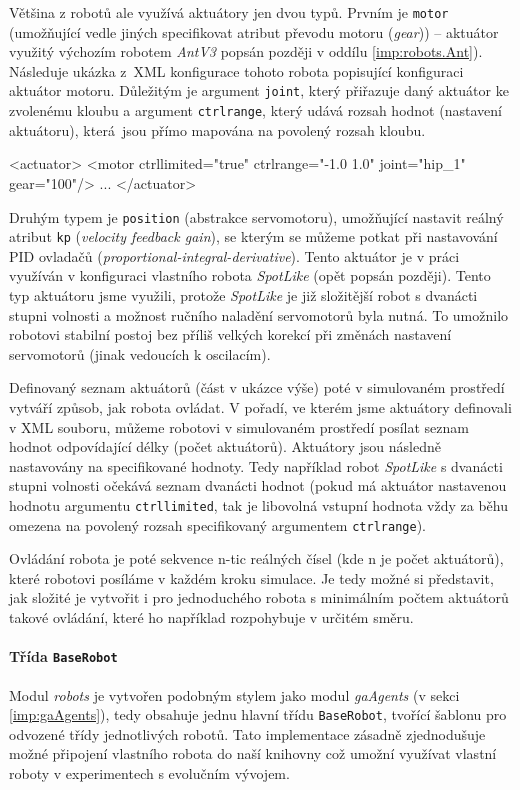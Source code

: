 Většina z robotů ale využívá aktuátory jen dvou typů. Prvním je \texttt{motor}
(umožňující vedle jiných specifikovat atribut převodu motoru (\emph{gear})) --
aktuátor využitý výchozím robotem \emph{AntV3} popsán později v oddílu
\ref{imp:robots.Ant}). Následuje ukázka z~XML konfigurace tohoto robota
popisující konfiguraci aktuátor motoru. Důležitým je argument
\texttt{joint}, který přiřazuje daný aktuátor ke zvolenému kloubu a argument
\texttt{ctrlrange}, který udává rozsah hodnot (nastavení aktuátoru), která~jsou
přímo mapována na povolený rozsah kloubu.
\begin{code}
<actuator>
  <motor ctrllimited="true" ctrlrange="-1.0 1.0" joint="hip_1"   
   gear="100"/>
  ...
</actuator>
\end{code}
Druhým typem je \texttt{position} (abstrakce servomotoru), umožňující nastavit
reálný atribut \texttt{kp} (\emph{velocity feedback gain}), se kterým se můžeme
potkat při nastavování PID ovladačů (\emph{proportional-integral-derivative}).
Tento aktuátor je v práci využíván v konfiguraci vlastního robota
\emph{SpotLike} (opět popsán později). Tento typ aktuátoru jsme využili,
protože \emph{SpotLike} je již složitější robot s dvanácti stupni volnosti a
možnost ručního naladění servomotorů byla nutná. To umožnilo robotovi stabilní
postoj bez příliš velkých korekcí při změnách nastavení servomotorů (jinak
vedoucích k oscilacím).

Definovaný seznam aktuátorů (část v ukázce výše) poté v simulovaném prostředí
vytváří způsob, jak robota ovládat. V pořadí, ve kterém jsme aktuátory
definovali v XML souboru, můžeme robotovi v simulovaném prostředí posílat
seznam hodnot odpovídající délky (počet aktuátorů). Aktuátory jsou následně
nastavovány na specifikované hodnoty. Tedy například robot \emph{SpotLike} s
dvanácti stupni volnosti očekává seznam dvanácti hodnot (pokud má aktuátor
nastavenou hodnotu argumentu \texttt{ctrllimited}, tak je libovolná vstupní
hodnota vždy za běhu omezena na povolený rozsah specifikovaný argumentem
\texttt{ctrlrange}).

Ovládání robota je poté sekvence n-tic reálných čísel (kde n je počet
aktuátorů), které robotovi posíláme v každém kroku simulace. Je tedy možné si
představit, jak složité je vytvořit i pro jednoduchého robota s minimálním
počtem aktuátorů takové ovládání, které ho například rozpohybuje v určitém
směru.

\paragraph{Třída \texttt{BaseRobot}}
Modul \emph{robots} je vytvořen podobným stylem jako modul \emph{gaAgents} (v sekci
\ref{imp:gaAgents}), tedy obsahuje jednu hlavní třídu \texttt{BaseRobot},
tvořící šablonu pro odvozené třídy jednotlivých robotů. Tato implementace
zásadně zjednodušuje možné připojení vlastního robota do naší knihovny což
umožní využívat vlastní roboty v experimentech s evolučním vývojem. 

